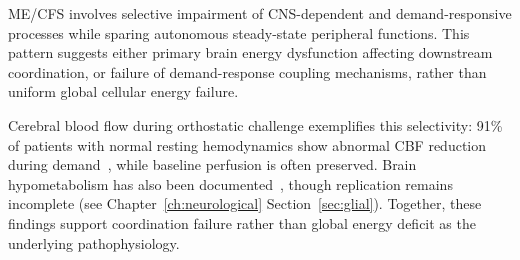 \begin{hypothesis}
\label{hyp:selective-energy}
ME/CFS involves selective impairment of CNS-dependent and demand-responsive processes while sparing autonomous steady-state peripheral functions. This pattern suggests either primary brain energy dysfunction affecting downstream coordination, or failure of demand-response coupling mechanisms, rather than uniform global cellular energy failure.

Cerebral blood flow during orthostatic challenge exemplifies this selectivity: 91\% of patients with normal resting hemodynamics show abnormal CBF reduction during demand~\cite{VanCampenEtAl2024}, while baseline perfusion is often preserved. Brain hypometabolism has also been documented~\cite{Nakatomi2014neuroinflammation}, though replication remains incomplete (see Chapter~\ref{ch:neurological} Section~\ref{sec:glial}). Together, these findings support coordination failure rather than global energy deficit as the underlying pathophysiology.
\end{hypothesis}


